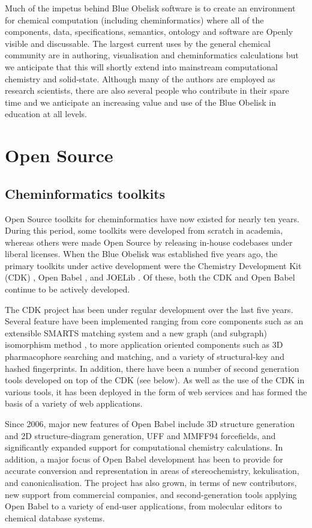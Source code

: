 \documentclass[10pt]{bmc_article}
\newenvironment{bmcformat}{\fussy\setboolean{publ}{true}}{\fussy}
\begin{document}
\begin{bmcformat}
Much of the impetus behind Blue Obelisk software is to create an
environment for chemical computation (including cheminformatics) where
all of the components, data, specifications, semantics, ontology and
software are Openly visible and discussable. The largest current uses
by the general chemical community are in authoring, visualisation and
cheminformatics calculations but we anticipate that this will shortly
extend into mainstream computational chemistry and solid-state.
Although many of the authors are employed as research scientists,
there are also several people who contribute in their spare time and
we anticipate an increasing value and use of the Blue Obelisk in
education at all levels.


\section*{Open Source}

\subsection*{Cheminformatics toolkits}

Open Source toolkits for cheminformatics have now existed for nearly
ten years. During this period, some toolkits were developed from
scratch in academia, whereas others were made Open Source by releasing in-house
codebases under liberal licenses. When the Blue Obelisk was
established five years ago, the primary toolkits under active development
were the Chemistry Development Kit (CDK)
\cite{Steinbeck2003, Steinbeck2006}, Open Babel \cite{WebOpen Babel},
and JOELib \cite{WebJOELib}. Of these, both the CDK and Open Babel
continue to be actively developed.

The CDK project has been under regular development over the last five
years. Several feature have been implemented ranging from core
components such as an extensible SMARTS matching system and a new graph
(and
subgraph) isomorphism method \cite{smsd}, to more application oriented
components such as 3D pharmacophore searching and matching, and a variety
of structural-key and hashed fingerprints. In addition, there have
been a number of second generation tools developed on top of the CDK
(see below). As well as the use of the CDK in various tools, it has been deployed in
the form of web services \cite{Dong:2007aa} and has formed the basis
of a variety of web applications.

Since 2006, major new features of Open Babel include 3D structure
generation and 2D structure-diagram generation, UFF and MMFF94
forcefields, and significantly expanded support for computational
chemistry calculations. In addition, a major focus of Open Babel development
has been to provide for accurate conversion and representation in
areas of stereochemistry, kekulisation, and canonicalisation. The
project has also grown, in terms of new contributors, new support from
commercial companies, and second-generation tools applying Open Babel
to a variety of end-user applications, from molecular editors to
chemical database systems.


\end{bmcformat}
\end{document}
